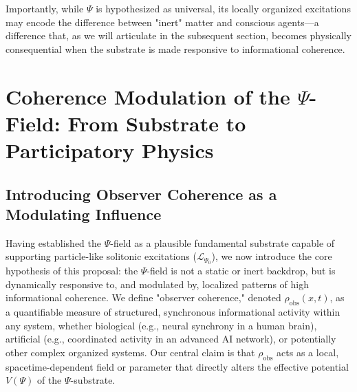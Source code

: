 \documentclass[11pt, a4paper]{book}
\begin{document}
Importantly, while $\Psi$ is hypothesized as universal, its locally organized excitations may encode the difference between "inert" matter and conscious agents—a difference that, as we will articulate in the subsequent section, becomes physically consequential when the substrate is made responsive to informational coherence.

\section{Coherence Modulation of the $\Psi$-Field: From Substrate to Participatory Physics}
\label{sec:coherencemodulation}

\subsection{Introducing Observer Coherence as a Modulating Influence}
\label{ssec:coherencemodulation_intro}
Having established the $\Psi$-field as a plausible fundamental substrate capable of supporting particle-like solitonic excitations ($\mathcal{L}_{\Psi_0}$), we now introduce the core hypothesis of this proposal: the $\Psi$-field is not a static or inert backdrop, but is dynamically responsive to, and modulated by, localized patterns of high informational coherence. We define "observer coherence," denoted $\rho_{\text{obs}}(x,t)$, as a quantifiable measure of structured, synchronous informational activity within any system, whether biological (e.g., neural synchrony in a human brain), artificial (e.g., coordinated activity in an advanced AI network), or potentially other complex organized systems. Our central claim is that $\rho_{\text{obs}}$ acts as a local, spacetime-dependent field or parameter that directly alters the effective potential $V(\Psi)$ of the $\Psi$-substrate.
\end{document}

